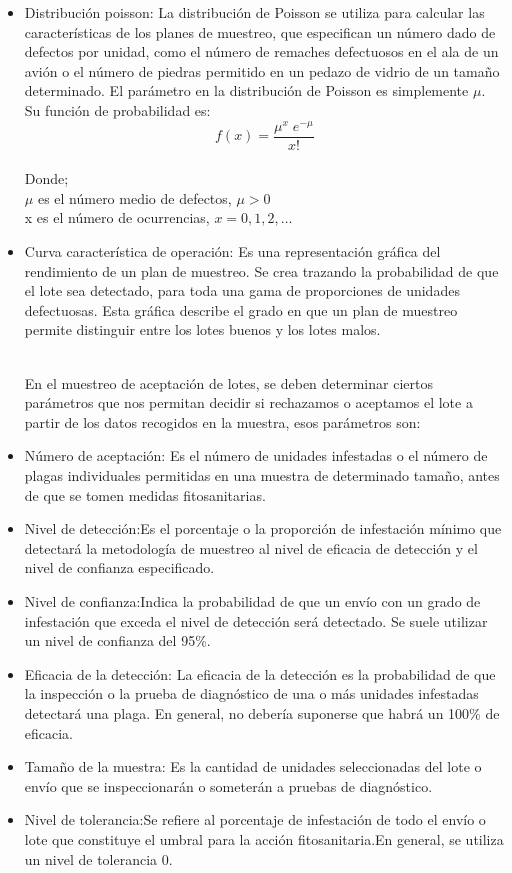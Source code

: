 \begin{itemize}
\item Distribuci\'{o}n poisson: La distribuci\'{o}n de Poisson se utiliza para calcular las caracter\'{i}sticas de los planes de muestreo, que especifican un n\'{u}mero dado de defectos por unidad, como el n\'{u}mero de remaches defectuosos en el ala de un avi\'{o}n o el n\'{u}mero de piedras permitido en un pedazo de vidrio de un tama\~{n}o determinado. El par\'{a}metro en la distribuci\'{o}n de Poisson es simplemente $\mu$. Su funci\'{o}n de probabilidad es:
$$f(x)=\frac{{\mu}^x \; e^{-\mu}}{x!}$$
~\\ Donde; 
~\\ $\mu$ es el n\'{u}mero medio de defectos, $\mu>0$
~\\ x es el n\'{u}mero de ocurrencias, $x=0,1,2,\dots$

\item Curva caracter\'{i}stica de operaci\'{o}n: Es una representaci\'{o}n gr\'{a}fica del rendimiento de un plan de muestreo. Se crea trazando la probabilidad de que el lote sea detectado, para toda una gama de proporciones de unidades defectuosas. Esta gr\'{a}fica describe el grado en que un plan de muestreo permite distinguir entre los lotes buenos y los lotes malos. \cite{OPE}

~\\En el muestreo de aceptaci\'{o}n de lotes, se deben determinar ciertos par\'{a}metros que nos permitan decidir si rechazamos o aceptamos el lote a partir de los datos recogidos en la muestra, esos par\'{a}metros son:
\item N\'{u}mero de aceptaci\'{o}n: Es el n\'{u}mero de unidades infestadas o el n\'{u}mero de plagas individuales permitidas en una
muestra de determinado tama\~{n}o, antes de que se tomen medidas fitosanitarias.\cite{MUES}
\item Nivel de detecci\'{o}n:Es el porcentaje o la proporci\'{o}n de infestaci\'{o}n m\'{i}nimo que detectar\'{a} la metodolog\'{i}a de muestreo
al nivel de eficacia de detecci\'{o}n y el nivel de confianza especificado.\cite{MUES}
\item Nivel de confianza:Indica la probabilidad de que un env\'{i}o con un grado de infestaci\'{o}n que exceda el nivel de
detecci\'{o}n ser\'{a} detectado. Se suele utilizar un nivel de confianza del 95\%.\cite{MUES}
\item Eficacia de la detecci\'{o}n: La eficacia de la detecci\'{o}n es la probabilidad de que la inspecci\'{o}n o la prueba de diagn\'{o}stico de una o m\'{a}s unidades infestadas detectar\'{a} una plaga. En general, no deber\'{i}a suponerse que habr\'{a} un 100\% de eficacia.\cite{MUES}
\item Tama\~{n}o de la muestra: Es la cantidad de unidades seleccionadas del lote o env\'{i}o que se inspeccionar\'{a}n o someter\'{a}n a
pruebas de diagn\'{o}stico.\cite{MUES}
\item Nivel de tolerancia:Se refiere al porcentaje de infestaci\'{o}n de todo el env\'{i}o o lote que constituye el umbral para la acci\'{o}n fitosanitaria.En general, se utiliza un nivel de tolerancia 0.\cite{MUES}
\end{itemize}
